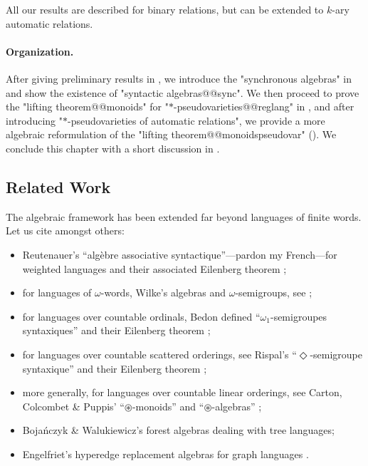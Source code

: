 \begin{remark}
	All our results are described for binary relations, but can be extended to
	$k$-ary automatic relations.
\end{remark}

\paragraph*{Organization.} After giving preliminary results in , we introduce
the "synchronous algebras" in  and show the existence of
"syntactic algebras@@sync". We then proceed to prove the "lifting theorem@@monoids" for 
"$*$-pseudovarieties@@reglang" in , and after introducing "$*$-pseudovarieties of automatic relations", we provide a more algebraic reformulation of the "lifting 
theorem@@monoidspseudovar" ().
We conclude this chapter with
a short discussion in .

\subsection{Related Work}
\label{sec:algebra-related-work}

The algebraic framework has been extended far beyond languages of finite words.
Let us cite amongst others:
\begin{itemize}
	\item Reutenauer's ``algèbre associative syntactique''---pardon my French---for weighted languages
		\cite[Théorème I.2.1, p.~451]{Reutenauer1980SeriesFormelles} and their associated Eilenberg theorem \cite[Théorème III.1.1, p.~469]{Reutenauer1980SeriesFormelles};
	\item for languages of $\omega$-words, Wilke's algebras and $\omega$-semigroups,
		see \cite[\S~II, pp.~75--131 \& \S~VI, pp.~265--306]{Perrin2004InfiniteWords};
	\item for languages over countable ordinals, Bedon defined ``$\omega_1$-semi\-groupes syntaxiques'' \cite[\S3, pp.~49--109]{Bedon1998LangagesReconnaissables} and their Eilenberg theorem
		\cite[Theorem 22, p.~62]{Bedon1998Eilenberg};
	\item for languages over countable scattered orderings, see Rispal's ``$\Diamond$-semigroupe syntaxique'' \cite[\S~4.4, pp.~82--86]{Rispal2004Automates} and their Eilenberg theorem
		\cite[Theorem 6, p.~144]{Bedon2005Schutzenberger};
	\item more generally, for languages over countable linear orderings, see Carton, Colcombet \& Puppis' ``$\circledast$-monoids'' and ``$\circledast$-algebras''
		\cite[\S~3, p.~7]{Carton2018Algebraic};
	\item Bojańczyk \& Walukiewicz's 
		forest algebras \cite[\S~1.3, p.~4]{Bojanczyk2008Forest} \cite[\S~5, p.~159]{Bojanczyk2020MSO}
		dealing with tree languages;
	\item Engelfriet's hyperedge replacement algebras for graph languages
		\cite[\S~2.3, p.~100]{Courcelle2012Graph} \cite[\S~6.2, p.~194]{Bojanczyk2015Recognisable}.
\end{itemize}

